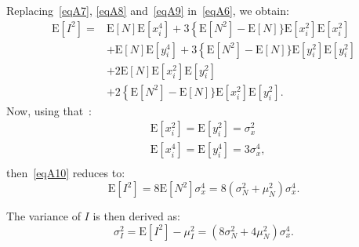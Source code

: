 \documentclass[journal]{IEEEtran}
\begin{document}
Replacing~\eqref{eqA7}, \eqref{eqA8} and~\eqref{eqA9} in~\eqref{eqA6}, we obtain:
\begin{equation}
\begin{split}
\mathrm{E}\left[ I^2 \right] = & \mathrm{E}\left[N\right]\mathrm{E}\left[x_{i}^{4}\right]+3 \left\{\mathrm{E}\left[ N^{2}\right]-\mathrm{E}\left[N\right]\right.\}\mathrm{E}\left[x_{i}^{2}\right] \mathrm{E}\left[x_{i}^{2}\right] \\
& + \mathrm{E}\left[N\right]\mathrm{E}\left[y_{i}^{4}\right]+3 \left\{\mathrm{E}\left[ N^{2}\right]-\mathrm{E}\left[N\right]\right.\}\mathrm{E}\left[y_{i}^{2}\right] \mathrm{E}\left[y_{i}^{2}\right] \\
& + 2 \mathrm{E}\left[N\right]\mathrm{E}\left[x_{i}^{2}\right] \mathrm{E}\left[y_{i}^{2}\right] \\
& + 2 \left\{\mathrm{E}\left[ N^{2}\right]-\mathrm{E}\left[N\right]\right.\}\mathrm{E}\left[x_{i}^{2}\right] \mathrm{E}\left[y_{i}^{2}\right].
\label{eqA10}
\end{split}
\end{equation}
Now, using that~\cite{Papoulis:2002}:
\begin{equation}
\begin{split}
& \mathrm{E}\left[x_{i}^{2}\right] = \mathrm{E}\left[y_{i}^{2}\right] = \sigma_{x}^{2} \\
& \mathrm{E}\left[x_{i}^{4}\right] = \mathrm{E}\left[y_{i}^{4}\right] = 3 \sigma_{x}^{4} ,\\
\label{eqA11}
\end{split}
\end{equation}
then~\eqref{eqA10} reduces to:
\begin{equation}
\mathrm{E}\left[I^{2}\right] = 8 \mathrm{E}\left[N^{2}\right]\sigma_{x}^{4} = 8(\sigma_{N}^{2} + \mu_{N}^{2})\sigma_{x}^{4}.
\label{eqA12}
\end{equation}

The variance of $I$ is then derived as:
\begin{equation}
\sigma_{I}^{2} = \mathrm{E}\left[I^{2}\right] - \mu_{I}^{2} = (8\sigma_{N}^{2} + 4\mu_{N}^{2})\sigma_{x}^{4}.
\label{eqA13}
\end{equation}
\end{document}
